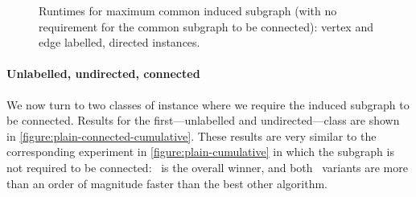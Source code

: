 \begin{figure}[h!]
    \centering
    \par\bigskip
    \caption{Runtimes for maximum
    common induced subgraph (with no requirement for the common subgraph
    to be connected): vertex and edge labelled, directed instances.}\label{figure:mcs-cumulative-labelled-not-connected}
\end{figure}









\paragraph{Unlabelled, undirected, connected}
We now turn to two classes of instance where we require the induced
subgraph to be connected.
Results for the first---unlabelled and undirected---class are shown
in \cref{figure:plain-connected-cumulative}.  These results are very similar to
the corresponding experiment in \cref{figure:plain-cumulative} in which the
subgraph is not required to be connected: \McSplitDown\ is the overall winner,
and both \McSplit\ variants are more than an order of magnitude faster than
the best other algorithm.

